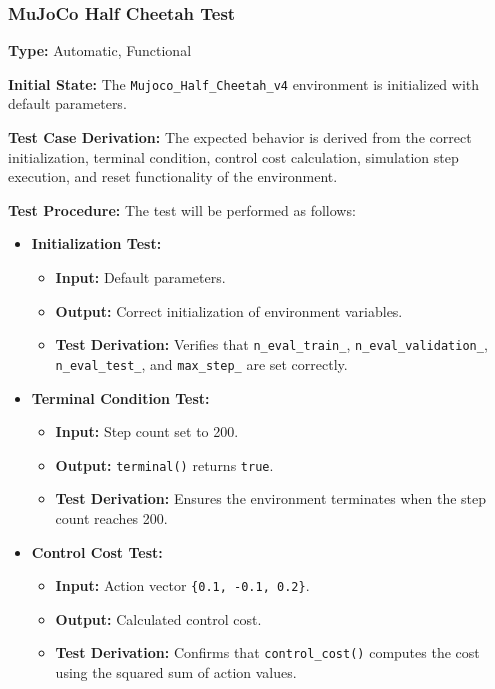 \documentclass[12pt, titlepage]{article}
\begin{document}
\subsubsection{MuJoCo Half Cheetah Test}

\textbf{Type:} Automatic, Functional

\textbf{Initial State:} The \texttt{Mujoco\_Half\_Cheetah\_v4} environment is initialized with default parameters.

\textbf{Test Case Derivation:} The expected behavior is derived from the correct initialization, terminal condition, control cost calculation, simulation step execution, and reset functionality of the environment.

\textbf{Test Procedure:} The test will be performed as follows:
\begin{itemize}
    \item \textbf{Initialization Test:}
    \begin{itemize}
        \item \textbf{Input:} Default parameters.
        \item \textbf{Output:} Correct initialization of environment variables.
        \item \textbf{Test Derivation:} Verifies that \texttt{n\_eval\_train\_}, \texttt{n\_eval\_validation\_}, \texttt{n\_eval\_test\_}, and \texttt{max\_step\_} are set correctly.
    \end{itemize}

    \item \textbf{Terminal Condition Test:}
    \begin{itemize}
        \item \textbf{Input:} Step count set to 200.
        \item \textbf{Output:} \texttt{terminal()} returns \texttt{true}.
        \item \textbf{Test Derivation:} Ensures the environment terminates when the step count reaches 200.
    \end{itemize}

    \item \textbf{Control Cost Test:}
    \begin{itemize}
        \item \textbf{Input:} Action vector \texttt{\{0.1, -0.1, 0.2\}}.
        \item \textbf{Output:} Calculated control cost.
        \item \textbf{Test Derivation:} Confirms that \texttt{control\_cost()} computes the cost using the squared sum of action values.
    \end{itemize}


\end{itemize}
\end{document}
